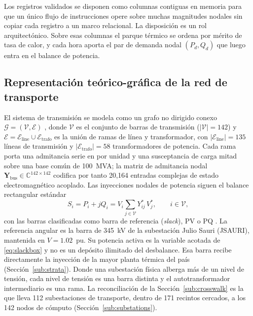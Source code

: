 Los registros validados se disponen como columnas contiguas en memoria para que un único flujo de instrucciones opere sobre muchas magnitudes nodales sin copiar cada registro a un marco relacional. La disposición es un rol arquitectónico. Sobre esas columnas el parque térmico se ordena por mérito de tasa de calor, y cada hora aporta el par de demanda nodal $(P_d, Q_d)$ que luego entra en el balance de potencia.

\subsection{Representación teórico-gráfica de la red de transporte}
\label{sub:graph}

El sistema de transmisión se modela como un grafo no dirigido conexo $\mathcal{G} = (\mathcal{V}, \mathcal{E})$ \cite{newman2010}, donde $\mathcal{V}$ es el conjunto de barras de transmisión ($|\mathcal{V}| = 142$) y $\mathcal{E} = \mathcal{E}_{\mathrm{line}} \cup \mathcal{E}_{\mathrm{trafo}}$ es la unión de ramas de línea y transformador, con $|\mathcal{E}_{\mathrm{line}}| = 135$ líneas de transmisión y $|\mathcal{E}_{\mathrm{trafo}}| = 58$ transformadores de potencia. Cada rama porta una admitancia serie en por unidad y una susceptancia de carga mitad sobre una base común de 100~MVA; la matriz de admitancia nodal $\mathbf{Y}_{\mathrm{bus}} \in \mathbb{C}^{142 \times 142}$ codifica por tanto 20,164 entradas complejas de estado electromagnético acoplado. Las inyecciones nodales de potencia siguen el balance rectangular estándar
\begin{equation}
S_i = P_i + jQ_i = V_i \sum_{j \in \mathcal{V}} Y_{ij}^{*}\, V_j^{*}, \qquad i \in \mathcal{V},
\label{eq:balance}
\end{equation}
con las barras clasificadas como barra de referencia (\emph{slack}), PV o PQ \cite{tinney1967}. La referencia angular es la barra de 345~kV de la subestación Julio Sauri (JSAURI), mantenida en $V = 1.02$~pu. Su potencia activa es la variable acotada de \eqref{eq:slackbox} y no es un depósito ilimitado del desbalance. Esa barra recibe directamente la inyección de la mayor planta térmica del país (Sección~\ref{sub:strata}). Donde una subestación física alberga más de un nivel de tensión, cada nivel de tensión es una barra distinta y el autotransformador intermediario es una rama. La reconciliación de la Sección~\ref{sub:crosswalk} es la que lleva 112 subestaciones de transporte, dentro de 171 recintos cercados, a los 142 nodos de cómputo (Sección~\ref{sub:substations}).

